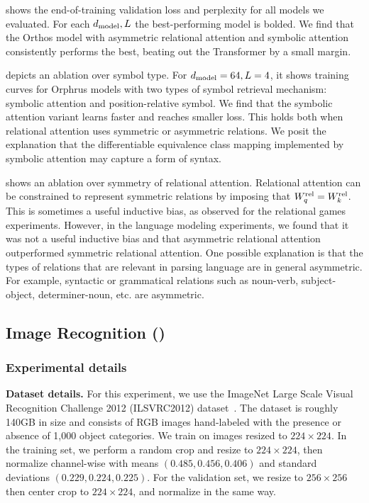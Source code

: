 shows the end-of-training validation loss and perplexity for all models we evaluated. For each $d_{\mathrm{model}}, L$ the best-performing model is bolded. We find that the Orthos model with asymmetric relational attention and symbolic attention consistently performs the best, beating out the Transformer by a small margin.

 depicts an ablation over symbol type. For $d_{\mathrm{model}} = 64, L = 4$, it shows training curves for Orphrus models with two types of symbol retrieval mechanism: symbolic attention and position-relative symbol. We find that the symbolic attention variant learns faster and reaches smaller loss. This holds both when relational attention uses symmetric or asymmetric relations. We posit the explanation that the differentiable equivalence class mapping implemented by symbolic attention may capture a form of syntax.

 shows an ablation over symmetry of relational attention. Relational attention can be constrained to represent symmetric relations by imposing that $W_q^{\mathrm{rel}} = W_k^{\mathrm{rel}}$. This is sometimes a useful inductive bias, as observed for the relational games experiments. However, in the language modeling experiments, we found that it was not a useful inductive bias and that asymmetric relational attention outperformed symmetric relational attention. One possible explanation is that the types of relations that are relevant in parsing language are in general asymmetric. For example, syntactic or grammatical relations such as noun-verb, subject-object, determiner-noun, etc. are asymmetric.

\subsection{Image Recognition ()}

\subsubsection*{Experimental details}

\textbf{Dataset details.} For this experiment, we use the ImageNet Large Scale Visual Recognition Challenge 2012 (ILSVRC2012) dataset~\citep{imagenet}. The dataset is roughly 140GB in size and consists of RGB images hand-labeled with the presence or absence of 1,000 object categories. We train on images resized to $224 \times 224$. In the training set, we perform a random crop and resize to $224 \times 224$, then normalize channel-wise with means $(0.485, 0.456, 0.406)$ and standard deviations $(0.229, 0.224, 0.225)$. For the validation set, we resize to $256 \times 256$ then center crop to $224 \times 224$, and normalize in the same way.

